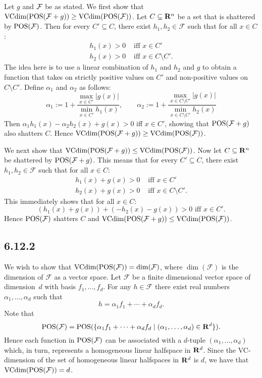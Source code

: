 Let $g$ and $\cal F$ be as stated. We first show that
$\text{VCdim}(\operatorname{POS}(\mathcal{F} + g)) \geq \text{VCdim} (\operatorname{POS} (\mathcal{F}) )$. Let $C \subseteq \mathbf{R}^n$ be a
set that is shattered by $\operatorname{POS}(\mathcal{F})$. Then for every $C' \subseteq C$, there exist
$h_1, h_2 \in \mathcal{F}$ such that for all $x \in C$:
\begin{align*}
    h_1(x) > 0 & \text { iff } x \in C' \\
    h_2(x) > 0 & \text{ iff } x \in C \setminus C'.
\end{align*}
The idea here is to use a linear combination of $h_1$ and $h_2$ and $g$ to obtain a function
that takes on strictly positive values on $C'$ and non-positive values on $C \setminus C'$.
Define $\alpha_1$ and $\alpha_2$ as follows:
\[
\alpha_1 := 1 + \frac{\max_{x \in C'} |g(x)|}{\min_{x \in C'} h_1(x)}, \qquad
\alpha_2 := 1 + \frac{{\max_{x \in C \setminus C'} |g(x)|}}{\min_{x \in C \setminus C'} h_2(x)}
\]
Then $\alpha_1 h_1(x) - \alpha_2 h_2(x) + g(x) > 0$ iff $x \in C'$, showing that
$\operatorname{POS} (\mathcal{F} + g)$ also shatters $C$. Hence
$\text{VCdim}(\operatorname{POS}(\mathcal{F} + g)) \geq \text{VCdim} (\operatorname{POS} (\mathcal{F}) )$.

We next show that $\text{VCdim}(\operatorname{POS}(\mathcal{F} + g)) \leq \text{VCdim} (\operatorname{POS} (\mathcal{F}) )$. Now let
$C \subseteq \mathbf{R}^n$ be shattered by $\operatorname{POS}(\mathcal{F} + g)$. This means that
for every $C' \subseteq C$, there exist $h_1, h_2 \in \mathcal{F}$ such that for
all $x \in C$:
\begin{align*}
    h_1(x) + g(x) > 0 & \text { iff } x \in C' \\
    h_2(x) + g(x) > 0 & \text{ iff } x \in C \setminus C'.
\end{align*}
This immediately shows that for all $x \in C$:
\[
    (h_1(x) + g(x)) + (- h_2(x) - g(x)) > 0 \text { iff } x \in C'.
\]
Hence $\operatorname{POS} (\mathcal{F})$ shatters $C$ and
$\text{VCdim}(\operatorname{POS}(\mathcal{F} + g)) \leq \text{VCdim} (\operatorname{POS} (\mathcal{F}) )$.

\subsection*{6.12.2}

 We wish to show that $\text{VCdim} (\operatorname{POS} (\mathcal{F})) = \dim (\mathcal{F})$, where
 $\dim (\mathcal{F})$ is the dimension of $\mathcal{F}$ as a vector space. Let
 $\mathcal{F}$ be a finite dimensional vector space of dimension~$d$ with basis
 $f_1, \ldots, f_d$. For any $h \in \mathcal{F}$ there exist real numbers
 $\alpha_1, \ldots, \alpha_d$ such that
 \[
    h = \alpha_1 f_1 + \cdots + \alpha_d f_d.
 \]
Note that
\[
    \operatorname{POS} (\mathcal{F}) = \operatorname{POS} (\{ \alpha_1 f_1 + \cdots + \alpha_d f_d
        \mid (\alpha_1, \ldots, \alpha_d) \in \mathbf{R}^d\}).
\]
Hence each function in $\operatorname{POS} (\mathcal{F} )$ can be associated with a $d$-tuple
$(\alpha_1, \ldots, \alpha_d)$ which, in turn, represents a homogeneous linear
halfspace in $\mathbf{R}^d$. Since the VC-dimension of the set of homogeneous linear
halfspaces in $\mathbf{R}^d$ is $d$, we have that $\text{VCdim} (\operatorname{POS} (\mathcal{F})) = d$.


